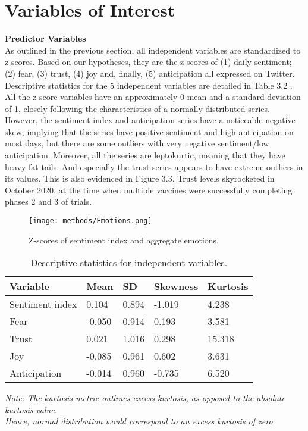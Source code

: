 \section{Variables of Interest}
\textbf{Predictor Variables} \\
As outlined in the previous section, all independent variables are standardized to z-scores. Based on our hypotheses, they are the z-scores of (1) daily sentiment; (2) fear, (3) trust, (4) joy and, finally, (5) anticipation all expressed on Twitter. Descriptive statistics for the 5 independent variables are detailed in Table 3.2 . All the z-score variables have an approximately 0 mean and a standard deviation of 1, closely following the characteristics of a normally distributed series. However, the sentiment index and anticipation series have a noticeable negative skew, implying that the series have positive sentiment and high anticipation on most days, but there are some outliers with very negative sentiment/low anticipation. Moreover, all the series are leptokurtic, meaning that they have heavy fat tails. And especially the trust series appears to have extreme outliers in its values. This is also evidenced in Figure 3.3. Trust levels skyrocketed in October 2020, at the time when multiple vaccines were successfully completing phases 2 and 3 of trials.
\begin{figure}[htp]
    \centering
    \texttt{[image: methods/Emotions.png]}
    \caption{Z-scores of sentiment index and aggregate emotions.}
    \label{fig:Emotions}
\end{figure}

\begin{table}[h]
\centering
\caption{Descriptive statistics for independent variables.}
\vspace{0.5cm}
\begin{tabular}{lllll}
\hline\hline
Variable & Mean & SD & Skewness & Kurtosis \\ \hline
Sentiment index & 0.104 & 0.894 & -1.019 & 4.238 \\
Fear & -0.050 & 0.914 & 0.193 & 3.581 \\
Trust &  0.021 & 1.016 & 0.298 & 15.318 \\
Joy & -0.085 & 0.961 & 0.602 & 3.631 \\
Anticipation & -0.014 & 0.960 & -0.735 & 6.520 \\
\hline
\end{tabular}
\begin{tablenotes}
    \small
      \item{\textit{Note: The kurtosis metric outlines excess kurtosis, as opposed to the absolute kurtosis value.\\Hence, normal distribution would correspond to an excess kurtosis of zero}}
\end{tablenotes}
\end{table}

